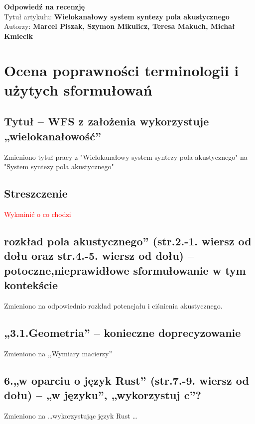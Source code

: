 \documentclass[12pt]{article}
\begin{document}
    
    \begin{center}
        \textbf{Odpowiedź na recenzję }\\
        \vspace{10pt}
        Tytuł artykułu: \textbf{Wielokanałowy system syntezy pola akustycznego} \\
        Autorzy: \textbf{Marcel Piszak, Szymon Mikulicz, Teresa Makuch, Michał Kmiecik}
    \end{center}
    

\section{Ocena poprawności terminologii i użytych sformułowań}


\subsection{Tytuł – WFS z założenia wykorzystuje „wielokanałowość”}

Zmieniono tytuł pracy z "Wielokanałowy system syntezy pola akustycznego" na "System syntezy pola akustycznego"

\subsection{Streszczenie}
\textcolor{red} {Wykminić o co chodzi}

\subsection{rozkład pola akustycznego” (str.2.-1. wiersz od dołu oraz str.4.-5. wiersz od dołu) – potoczne,nieprawidłowe sformułowanie w tym kontekście}

Zmieniono na odpowiednio rozkład potencjału i ciśnienia akustycznego.

\subsection{„3.1.Geometria” – konieczne doprecyzowanie}

Zmieniono na ,,Wymiary macierzy''

\subsection{6.„w oparciu o język Rust” (str.7.-9. wiersz od dołu) – „w języku”, „wykorzystuj c”?}
Zmieniono na \dots wykorzystując język Rust \dots
\end{document}
